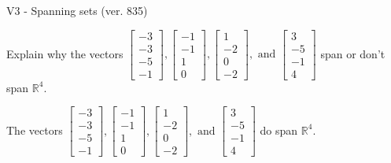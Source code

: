 \begin{exercise}
  \begin{exerciseTitle}V3 - Spanning sets (ver. 835)\end{exerciseTitle}
  \begin{exerciseStatement}
    Explain why the vectors \(\left[\begin{array}{r}
-3 \\
-3 \\
-5 \\
-1
\end{array}\right] , \left[\begin{array}{r}
-1 \\
-1 \\
1 \\
0
\end{array}\right] , \left[\begin{array}{r}
1 \\
-2 \\
0 \\
-2
\end{array}\right] , \text{ and } \left[\begin{array}{r}
3 \\
-5 \\
-1 \\
4
\end{array}\right]\) span or don't span \(\mathbb{R}^4\). 
	


  \end{exerciseStatement}
  \begin{exerciseAnswer}
   The vectors \(\left[\begin{array}{r}
-3 \\
-3 \\
-5 \\
-1
\end{array}\right] , \left[\begin{array}{r}
-1 \\
-1 \\
1 \\
0
\end{array}\right] , \left[\begin{array}{r}
1 \\
-2 \\
0 \\
-2
\end{array}\right] , \text{ and } \left[\begin{array}{r}
3 \\
-5 \\
-1 \\
4
\end{array}\right]\) 
  	 do  
	span \(\mathbb{R}^4\).
  


  \end{exerciseAnswer}
\end{exercise}